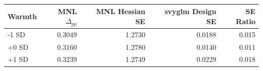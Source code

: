 \begin{tabular}{lrrrr}
\toprule
Warmth & MNL $\Delta_{pp}$ & MNL Hessian SE & svyglm Design SE & SE Ratio \\
\midrule
-1 SD & 0.3049 & 1.2730 & 0.0188 & 0.015 \\
+0 SD & 0.3160 & 1.2780 & 0.0140 & 0.011 \\
+1 SD & 0.3239 & 1.2749 & 0.0229 & 0.018 \\
\bottomrule
\end{tabular}
